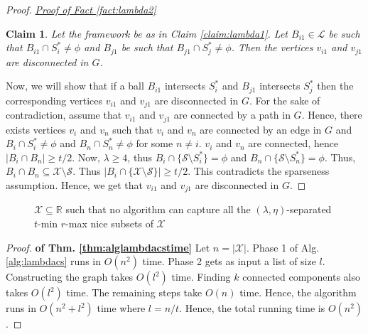 \documentclass[anon,12pt]{colt2016} %
\newtheorem{claim}[theorem]{Claim}
\newcommand{\mc}{\mathcal}
\begin{document}
\begin{proof}
\noindent\textit{\underline{Proof of Fact \ref{fact:lambda2}}}
\begin{claim}
Let the framework be as in Claim \ref{claim:lambda1}. Let $B_{i1} \in \mc L$ be such that $B_{i1} \cap S_i^* \neq \phi$ and $B_{j1}$ be such that $B_{j1} \cap S_j^* \neq \phi$. Then the vertices $v_{i1}$ and $v_{j1}$ are disconnected in $G$.
\end{claim}
\vspace{-0.1in} Now, we will show that if a ball $B_{i1}$ intersects $S_i^*$ and $B_{j1}$ intersects $S_j^*$ then the corresponding vertices $v_{i1}$ and $v_{j1}$ are disconnected in $G$. For the sake of contradiction, assume that $v_{i1}$ and $v_{j1}$ are connected by a path in $G$. Hence, there exists vertices $v_{i}$ and $v_{n}$ such that $v_i$ and $v_n$ are connected by an edge in $G$ and $B_i \cap S_i^* \neq \phi$ and $B_n \cap S_n^* \neq \phi$ for some $n \neq i$. $v_i$ and $v_n$ are connected, hence $|B_i \cap B_n| \ge t/2$. Now, $\lambda \ge 4$, thus $B_i \cap \{\mc S \setminus S_i^*\} = \phi$ and $B_n \cap \{\mc S\setminus S_n^*\} = \phi$. Thus, $B_i \cap B_n \subseteq \mc X \setminus \mc S$. Thus $|B_{i} \cap \{\mc X \setminus \mc S\}| \ge t/2$. This contradicts the sparseness assumption. Hence, we get that $v_{i1}$ and $v_{j1}$ are disconnected in $G$.
\end{proof}

\begin{figure}

\caption{$\mc X \subseteq \mathbb{R}$ such that no algorithm can capture all the $(\lambda, \eta)$-separated $t$-min $r$-max nice subsets of $\mc X$}
\label{fig:noalglambdacs}
\end{figure}

\begin{proof}\textbf{ of Thm. \ref{thm:alglambdacstime}}
Let $n = |\mc X|$. Phase 1 of Alg. \ref{alg:lambdacs} runs in $O(n^2)$ time. Phase 2 gets as input a list of size $l$. Constructing the graph takes $O(l^2)$ time. Finding $k$ connected components also takes $O(l^2)$ time. The remaining steps take $O(n)$ time. Hence, the algorithm runs in $O(n^2 + l^2)$ time where $l = n/t$. Hence, the total running time is $O(n^2)$.
\end{proof}
\end{document}
